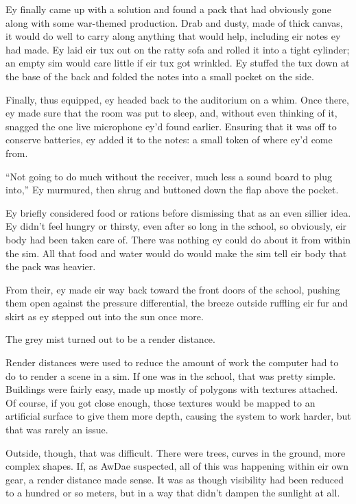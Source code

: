 Ey finally came up with a solution and found a pack that had obviously gone along with some war-themed production. Drab and dusty, made of thick canvas, it would do well to carry along anything that would help, including eir notes ey had made. Ey laid eir tux out on the ratty sofa and rolled it into a tight cylinder; an empty sim would care little if eir tux got wrinkled. Ey stuffed the tux down at the base of the back and folded the notes into a small pocket on the side.

Finally, thus equipped, ey headed back to the auditorium on a whim. Once there, ey made sure that the room was put to sleep, and, without even thinking of it, snagged the one live microphone ey'd found earlier. Ensuring that it was off to conserve batteries, ey added it to the notes: a small token of where ey'd come from.

``Not going to do much without the receiver, much less a sound board to plug into,'' Ey murmured, then shrug and buttoned down the flap above the pocket.

Ey briefly considered food or rations before dismissing that as an even sillier idea. Ey didn't feel hungry or thirsty, even after so long in the school, so obviously, eir body had been taken care of. There was nothing ey could do about it from within the sim. All that food and water would do would make the sim tell eir body that the pack was heavier.

From their, ey made eir way back toward the front doors of the school, pushing them open against the pressure differential, the breeze outside ruffling eir fur and skirt as ey stepped out into the sun once more.

\secdiv

The grey mist turned out to be a render distance.

Render distances were used to reduce the amount of work the computer had to do to render a scene in a sim. If one was in the school, that was pretty simple. Buildings were fairly easy, made up mostly of polygons with textures attached. Of course, if you got close enough, those textures would be mapped to an artificial surface to give them more depth, causing the system to work harder, but that was rarely an issue.

Outside, though, that was difficult. There were trees, curves in the ground, more complex shapes. If, as AwDae suspected, all of this was happening within eir own gear, a render distance made sense. It was as though visibility had been reduced to a hundred or so meters, but in a way that didn't dampen the sunlight at all.

